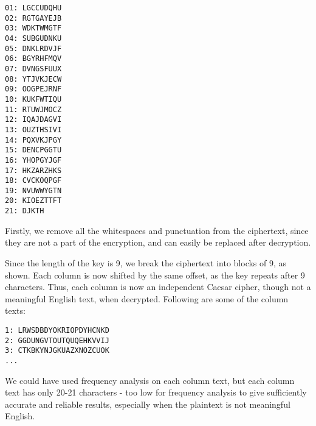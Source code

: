 \documentclass[11pt]{article}
\begin{document}
\begin{enumerate}
  \begin{minipage}{0.2\linewidth}
\texttt{01: LGCCUDQHU}\\
\texttt{02: RGTGAYEJB}\\
\texttt{03: WDKTWMGTF}\\
\texttt{04: SUBGUDNKU}\\
\texttt{05: DNKLRDVJF}\\
\texttt{06: BGYRHFMQV}\\
\texttt{07: DVNGSFUUX}\\
\texttt{08: YTJVKJECW}\\
\texttt{09: OOGPEJRNF}\\
\texttt{10: KUKFWTIQU}\\
\texttt{11: RTUWJMOCZ}\\
\texttt{12: IQAJDAGVI}\\
\texttt{13: OUZTHSIVI}\\
\texttt{14: PQXVKJPGY}\\
\texttt{15: DENCPGGTU}\\
\texttt{16: YHOPGYJGF}\\
\texttt{17: HKZARZHKS}\\
\texttt{18: CVCKOQPGF}\\
\texttt{19: NVUWWYGTN}\\
\texttt{20: KIOEZTTFT}\\
\texttt{21: DJKTH}
  \end{minipage}
  \begin{minipage}{0.75\linewidth}
    Firstly, we remove all the whitespaces and punctuation from the ciphertext, since they are not a part of the encryption, and can easily be replaced after decryption.
    \medskip

    Since the length of the key is 9, we break the ciphertext into blocks of 9, as shown. Each column is now shifted by the same offset, as the key repeats after 9 characters. Thus, each column is now an independent Caesar cipher, though not a meaningful English text, when decrypted. Following are some of the column texts:
    \medskip

    \begin{center}
      \texttt{1: LRWSDBDYOKRIOPDYHCNKD}\\
    \texttt{2: GGDUNGVTOUTQUQEHKVVIJ}\\
    \texttt{3: CTKBKYNJGKUAZXNOZCUOK}\\
    \texttt{...}
    \end{center}

    We could have used frequency analysis on each column text, but each column text has only 20-21 characters - too low for frequency analysis to give sufficiently accurate and reliable results, especially when the plaintext is not meaningful English.
  \end{minipage}


\end{enumerate}
\end{document}
